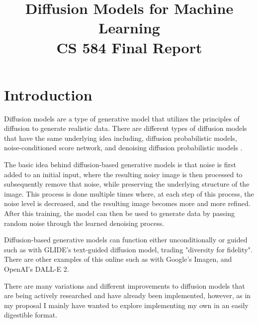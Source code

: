 \documentclass[conference]{IEEEtran}
\begin{document}
\title{%
    Diffusion Models for Machine Learning \\
    \huge CS 584 Final Report}

\author{
}

\maketitle

\section{Introduction}

Diffusion models are a type of generative model that utilizes the principles of diffusion to generate realistic data. There are different types of diffusion models
that have the same underlying idea including, diffusion probabilistic models, noise-conditioned score network,
and denoising diffusion probabilistic models \cite{weng2021diffusion}.

The basic idea behind diffusion-based generative models is that noise is first added to an initial input,
where the resulting noisy image is then processed to subsequently remove that noise, while preserving the underlying structure of the image.
This process is done multiple times where, at each step of this process, the noise level is decreased, and the resulting image becomes more and more refined. After this training, the model can then be used to generate data by passing random noise through the learned denoising process.

Diffusion-based generative models can function either unconditionally or guided such as with GLIDE's text-guided diffusion model, trading "diversity for fidelity"\cite{GLIDE}. There are other examples of this online such as with Google's Imagen, and OpenAI's DALL-E 2.

There are many variations\cite{hoCF}\cite{kerasDDPM}\cite{pmlr-v162-nichol22a}\cite{hugimpl} and different improvements\cite{nichol2021improved}\cite{song2022denoising} to diffusion models that are being actively researched and have already been implemented, however, as in my proposal I mainly have wanted to explore implementing my own in an easily digestible format.
\end{document}
